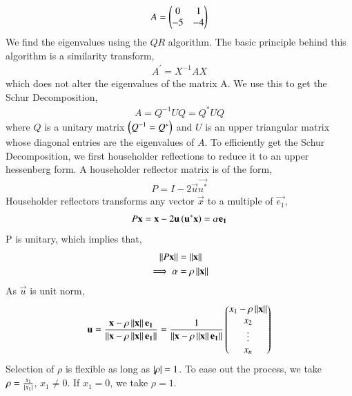 \documentclass[journal]{IEEEtran}
\begin{document}
\begin{align}
    A=\begin{pmatrix}0 & 1\\-5 & -4\end{pmatrix}
\end{align}
We find the eigenvalues using the $QR$ algorithm. The basic principle behind this algorithm is a similarity transform,
\begin{align}
	A^{\prime} = X^{-1}AX
\end{align}
which does not alter the eigenvalues of the matrix A. 
\newline
We use this to get the Schur Decomposition,
\begin{align}
	A = Q^{-1}UQ = Q^{\ast}UQ
\end{align}
where $Q$ is a unitary matrix $\left(Q^{-1} = Q^{\ast}\right)$ and $U$ is an upper triangular matrix whose diagonal entries are the eigenvalues of $A$.
\newline
To efficiently get the Schur Decomposition, we first householder reflections to reduce it to an upper hessenberg form.
\newline
A householder reflector matrix is of the form,
\begin{align}
	P = I - 2\vec{u}\vec{u^{\ast}}
\end{align}
Householder reflectors transforms any vector $\vec{x}$ to a multiple of $\vec{e_1}$,
\begin{align}
	P\mathbf{x} = \mathbf{x} - 2\mathbf{u}\left(\mathbf{u^{\ast}}\mathbf{x}\right) = \alpha \mathbf{e_1}
\end{align}
P is unitary, which implies that,
\begin{align}
	\left\lVert P\mathbf{x}\right\rVert &= \left\lVert\mathbf{x}\right\rVert\\
	\implies \alpha &= \rho\left\lVert\mathbf{x}\right\rVert\\
\end{align}
As $\vec{u}$ is unit norm,
\begin{align}
	\mathbf{u} = \frac{\mathbf{x} - \rho\left\lVert\mathbf{x}\right\rVert\mathbf{e_1}}{\left\lVert\mathbf{x} - \rho\left\lVert\mathbf{x}\right\rVert\mathbf{e_1}\right\rVert} = \frac{1}{\left\lVert\mathbf{x} - \rho\left\lVert\mathbf{x}\right\rVert\mathbf{e_1}\right\rVert} \begin{pmatrix} x_1 - \rho\left\lVert\mathbf{x}\right\rVert\\x_2\\\vdots\\x_n\end{pmatrix}
\end{align}
Selection of $\rho$ is flexible as long as $\left\vert\rho\right\vert = 1$. To ease out the process, we take $\rho = \frac{x_1}{\left\vert x_1\right\vert}$, $x_1 \neq 0$. If $x_1 = 0$, we take $\rho = 1$.
\newline
\end{document}
